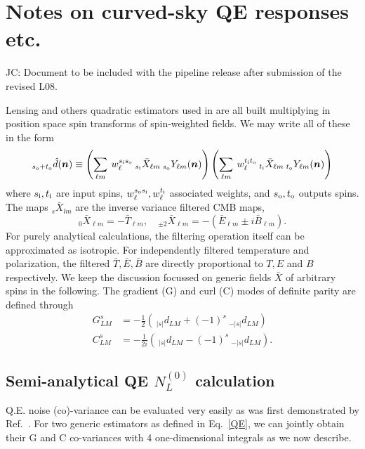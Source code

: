 \documentclass[reprint,prd, superscriptaddress, tightenlines, longbibliography, nofootinbib, eqsecnum, amsfonts, amsmath, floatfix, notitlepage, onecolumn]{revtex4-1}
\newcommand{\si}[0]{{s_{\rm i}}}
\newcommand{\ti}[0]{{t_{\rm i}}}
\newcommand{\so}[0]{{s_{\rm o}}}
\renewcommand{\to}[0]{{t_{\rm o}}}
\newcommand{\JC}[1]{\color{red}JC: #1\color{black}}
\newcommand{\hn}[0]{\boldsymbol{n}}
\begin{document}
	
\tableofcontents

\section{   Notes on curved-sky QE responses etc.}
\JC{Document to be included with the pipeline release after submission of the revised L08.}

Lensing and others quadratic estimators used in \cite{??} are all built multiplying in position space spin transforms of spin-weighted fields. We may write all of these in the form \begin{equation}\label{QE}
 _{\so + \to}\hat d(\hn) \equiv  \left(\sum_{\ell m}\: w^{\si\so}_\ell \:_{\si} \bar X_{\ell m} \:_\so Y_{\ell m}(\hn)\right)\left(\sum_{\ell m}\:w^{\ti\to}_\ell  \:_{\ti} \bar X_{\ell m} \:_\to Y_{\ell m}(\hn)\right)
\end{equation}
where $\si, \ti$ are input spins, $w_\ell^{\so\si}, w_\ell^{\ti}$ associated weights, and  $\so, \to$ outputs spins. The maps $_s \bar X_{lm}$ are the inverse variance filtered CMB maps,
\begin{equation}
	_0 \bar X_{\ell m} = -\bar T_{\ell m} , \quad _{\pm 2} \bar X_{\ell m} = -\left(\bar E_{\ell m} \pm i\bar B_{\ell m} \right).
\end{equation}
For purely analytical calculations, the filtering operation itself can be approximated as isotropic. For independently filtered temperature and polarization, the filtered $\bar T, \bar E, \bar B$ are directly proportional to $T, E$ and $B$ respectively. 
We keep the discussion focussed on generic fields $\bar X$ of arbitrary spins in the following. The gradient (G) and curl (C) modes of definite parity are defined through
\begin{eqnarray*}
		G^{s}_{LM} &= -\frac 12\left(\:_{|s|} d_{LM} + (-1)^s \:_{-|s|} d_{LM}\right)  \\
		C^{s}_{LM} &=-\frac 1{2i} \left( \:_{|s|} d_{LM} - (-1)^s \:_{-|s|} d_{LM} \right) .
\end{eqnarray*}
\subsection{Semi-analytical QE $N^{(0)}_L$ calculation}
Q.E. noise (co)-variance can be evaluated very easily as was first demonstrated by Ref.~\cite{}. For two generic estimators as defined in Eq.~\eqref{QE}, we can jointly obtain their G and C co-variances with 4 one-dimensional integrals as we now describe.
\end{document}
